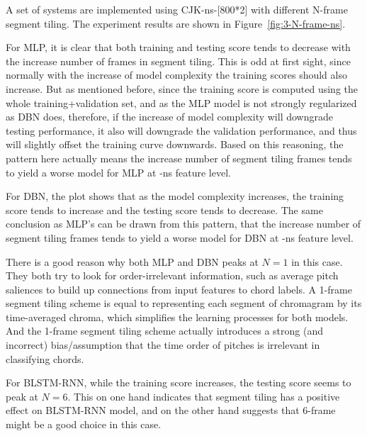 A set of systems are implemented using CJK-ns-[800*2] with different N-frame segment tiling. The experiment results are shown in Figure~\ref{fig:3-N-frame-ns}.

For MLP, it is clear that both training and testing score tends to decrease with the increase number of frames in segment tiling. This is odd at first sight, since normally with the increase of model complexity the training scores should also increase. But as mentioned before, since the training score is computed using the whole training+validation set, and as the MLP model is not strongly regularized as DBN does, therefore, if the increase of model complexity will downgrade testing performance, it also will downgrade the validation performance, and thus will slightly offset the training curve downwards. Based on this reasoning, the pattern here actually means the increase number of segment tiling frames tends to yield a worse model for MLP at -ns feature level.

For DBN, the plot shows that as the model complexity increases, the training score tends to increase and the testing score tends to decrease. The same conclusion as MLP's can be drawn from this pattern, that the increase number of segment tiling frames tends to yield a worse model for DBN at -ns feature level.

There is a good reason why both MLP and DBN peaks at $N=1$ in this case. They both try to look for order-irrelevant information, such as average pitch saliences to build up connections from input features to chord labels. A 1-frame segment tiling scheme is equal to representing each segment of chromagram by its time-averaged chroma, which simplifies the learning processes for both models. And the 1-frame segment tiling scheme actually introduces a strong (and incorrect) bias/assumption that the time order of pitches is irrelevant in classifying chords.

For BLSTM-RNN, while the training score increases, the testing score seems to peak at $N=6$. This on one hand indicates that segment tiling has a positive effect on BLSTM-RNN model, and on the other hand suggests that 6-frame might be a good choice in this case.

